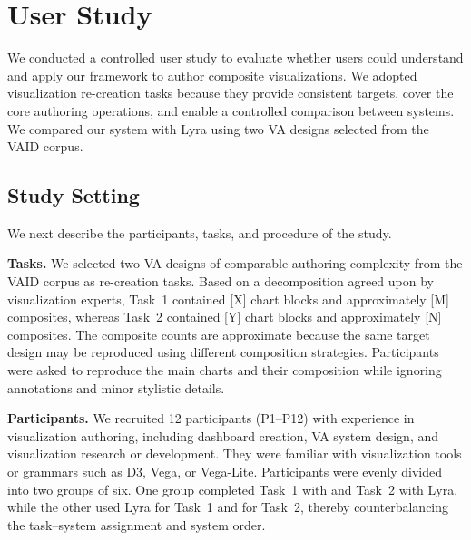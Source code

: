 \section{User Study}

We conducted a controlled user study to evaluate whether users could
understand and apply our framework to author composite visualizations. We
adopted visualization re-creation tasks because they provide consistent
targets, cover the core authoring operations, and enable a controlled
comparison between systems. We compared our system with Lyra using two VA
designs selected from the VAID corpus.

\subsection{Study Setting}
We next describe the participants, tasks, and procedure of the study.

\textbf{Tasks.}
We selected two VA designs of comparable authoring complexity from the VAID
corpus as re-creation tasks. Based on a decomposition agreed upon by
visualization experts, Task~1 contained [X] chart blocks and approximately
[M] composites, whereas Task~2 contained [Y] chart blocks and approximately
[N] composites. The composite counts are approximate because the same target
design may be reproduced using different composition strategies. Participants
were asked to reproduce the main charts and their composition while ignoring
annotations and minor stylistic details.

\textbf{Participants.}
We recruited 12 participants (P1--P12) with experience in visualization
authoring, including dashboard creation, VA system design, and visualization
research or development. They were familiar with visualization tools or
grammars such as D3, Vega, or Vega-Lite. Participants were evenly divided
into two groups of six. One group completed Task~1 with {\system} and Task~2
with Lyra, while the other used Lyra for Task~1 and {\system} for Task~2,
thereby counterbalancing the task--system assignment and system order.


